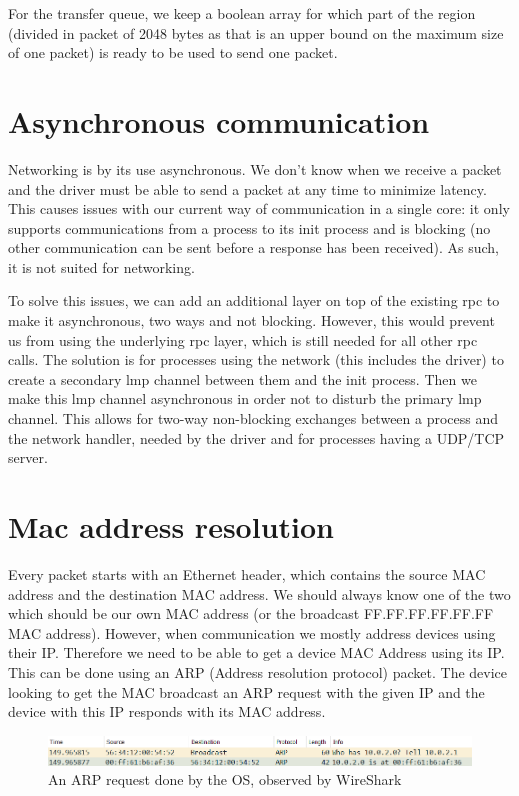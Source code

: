 For the transfer queue, we keep a boolean array for which part of the region (divided in packet of 2048 bytes as that is an upper bound on the maximum size of one packet) is ready to be used to send one packet.

\section{Asynchronous communication}

Networking is by its use asynchronous. We don't know when we receive a packet and the driver must be able to send a packet at any time to minimize latency. This causes issues with our current way of communication in a single core: it only supports communications from a process to its init process and is blocking (no other communication can be sent before a response has been received). As such, it is not suited for networking.

\medskip

To solve this issues, we can add an additional layer on top of the existing rpc to make it asynchronous, two ways and not blocking. However, this would prevent us from using the underlying rpc layer, which is still needed for all other rpc calls. The solution is for processes using the network (this includes the driver) to create a secondary lmp channel between them and the init process. Then we make this lmp channel asynchronous in order not to disturb the primary lmp channel. This allows for two-way non-blocking exchanges between a process and the network handler, needed by the driver and for processes having a UDP/TCP server.

\section{Mac address resolution}

Every packet starts with an Ethernet header, which contains the source MAC address and the destination MAC address. We should always know one of the two which should be our own MAC address (or the broadcast FF.FF.FF.FF.FF.FF MAC address). However, when communication we mostly address devices using their IP. Therefore we need to be able to get a device MAC Address using its IP. This can be done using an ARP (Address resolution protocol) packet. The device looking to get the MAC broadcast an ARP request with the given IP and the device with this IP responds with its MAC address.

\begin{figure}
    \centering
    \includegraphics[scale=0.6]{images/network/arp_request.png}
    \caption{An ARP request done by the OS, observed by WireShark}
\end{figure}

